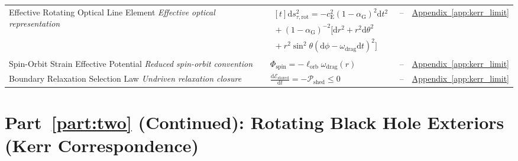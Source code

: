 \begin{longtable}{@{} p{4.5cm} p{6cm} c p{4cm} @{}}
{\raggedright Effective Rotating Optical Line Element \newline \textit{Effective optical representation}\par} & {\raggedright $\begin{gathered}[t]\mathrm ds_{\tau,\mathrm{rot}}^2=-c_{\mathrm E}^2(1-\alpha_{\mathrm G})^2\mathrm dt^2 \\ {}+(1-\alpha_{\mathrm G})^{-2}\bigl[\mathrm dr^2+r^2\mathrm d\theta^2 \\ {}+r^2\sin^2\theta(\mathrm d\phi-\omega_{\mathrm{drag}}\mathrm dt)^2\bigr]\end{gathered}$\par} & -- & {\raggedright \hyperref[app:kerr_limit]{Appendix~\ref*{app:kerr_limit}}\par} \\

{\raggedright Spin-Orbit Strain Effective Potential \newline \textit{Reduced spin-orbit convention}\par} & {\raggedright $\Phi_{\mathrm{spin}} = - \ell_{\mathrm{orb}} \omega_{\mathrm{drag}}(r)$\par} & -- & {\raggedright \hyperref[app:kerr_limit]{Appendix~\ref*{app:kerr_limit}}\par} \\

{\raggedright Boundary Relaxation Selection Law \newline \textit{Undriven relaxation closure}\par} & {\raggedright $\frac{\mathrm{d}\mathcal{E}_{\mathrm{stored}}}{\mathrm{d}t} = - \mathcal{P}_{\mathrm{shed}} \leq 0$\par} & -- & {\raggedright \hyperref[app:kerr_limit]{Appendix~\ref*{app:kerr_limit}}\par} \\

\bottomrule
\end{longtable}

\par\ifdim\dimexpr\pagegoal-\pagetotal\relax<12\baselineskip\newpage\fi
\section*{Part~\ref{part:two} (Continued): Rotating Black Hole Exteriors (Kerr Correspondence)}

